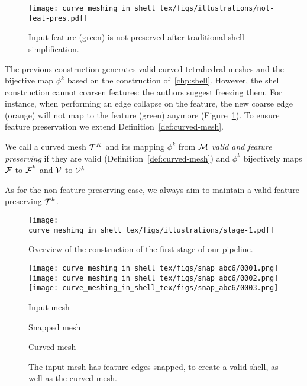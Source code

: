 \begin{figure}
    \centering
    \texttt{[image: curve\_meshing\_in\_shell\_tex/figs/illustrations/not-feat-pres.pdf]}
    \caption{Input feature (green) is not preserved after traditional shell simplification.}
    \label{bichon:fig:not-feat-pres}
\end{figure}

The previous construction generates valid curved tetrahedral meshes and the bijective map $\phi^k$ based on the construction of~\ref{chp:shell}. However, the shell construction cannot coarsen features{:} the authors suggest {freezing} them. For instance, when performing an edge collapse on the feature, the new coarse edge (orange) will not map to the feature (green) anymore (Figure~\ref{bichon:fig:not-feat-pres}). 
To ensure feature preservation we extend Definition~\ref{def:curved-mesh}.
\begin{definition}\label{def:curved-features}
We call a curved mesh $\mathcal{T}^K$ and its mapping $\phi^k$ from $\mathcal{M}$ \emph{valid and feature preserving} if they are valid (Definition~\ref{def:curved-mesh}) and $\phi^k$ bijectively maps $\operatorname{\mathcal{F}}$ to $\operatorname{\mathcal{F}}^k$ and $\mathcal{V}$ to $\mathcal{V}^k$
\end{definition}
As for the non-feature preserving case, we always aim to maintain a valid feature preserving $\mathcal{T}^k$.


\begin{figure}
    \centering
    \texttt{[image: curve\_meshing\_in\_shell\_tex/figs/illustrations/stage-1.pdf]}
    \caption{Overview of the construction of the first stage of our pipeline.}
    \label{bichon:fig:stage-1}
\end{figure}

\begin{figure}
    \centering
    \texttt{[image: curve\_meshing\_in\_shell\_tex/figs/snap\_abc6/0001.png]}\hfill
     \texttt{[image: curve\_meshing\_in\_shell\_tex/figs/snap\_abc6/0002.png]}\hfill
     \texttt{[image: curve\_meshing\_in\_shell\_tex/figs/snap\_abc6/0003.png]}\par
     \parbox{.33\linewidth}{\centering Input mesh}\hfill
     \parbox{.33\linewidth}{\centering Snapped mesh}\hfill
     \parbox{.33\linewidth}{\centering Curved mesh}
    \caption{The input mesh has feature edges snapped, to create a valid shell, as well as the curved mesh.}
    \label{bichon:fig:ex-snapping}
\end{figure}

